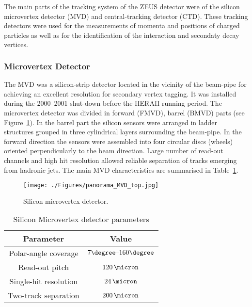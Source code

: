 The main parts of the tracking system of the ZEUS detector were of the silicon microvertex detector (MVD) and central-tracking detector (CTD). These tracking detectors were used for the measurements of momenta and positions of charged particles as well as for the identification of the interaction and secondaty decay vertices.

\subsubsection{Microvertex Detector}
\label{subsubsec:mvd}
The MVD was a silicon-strip detector located in the vicinity of the beam-pipe for achieving an excellent resolution for secondary vertex tagging. It was installed during the 2000--2001 shut-down before the HERAII running period. The microvertex detector was divided in forward (FMVD), barrel (BMVD) parts (see Figure~\ref{fig:MVD_artistic}). In the barrel part the silicon sensors were arranged in ladder structures grouped in three cylindrical layers surrounding the beam-pipe. In the forward direction the sensors were assembled into four circular discs (wheels) oriented perpendicularly to the beam direction. Large number of read-out channels and high hit resolution allowed reliable separation of tracks emerging from hadronic jets. The main MVD characteristics are summarised in Table~\ref{tab:mvdgeomparameters}. 

\begin{figure}[htbp]
	\centering
		\texttt{[image: ./Figures/panorama\_MVD\_top.jpg]}
	\caption{Silicon microvertex detector.}
	\label{fig:MVD_artistic}
\end{figure}

\begin{table}[htbp]
\begin{tabular}{ | c | c | }
     \hline
      Parameter & Value \\
			\hline
			\hline
			Polar-angle coverage & $7\degree \mbox{--} 160\degree$ \\ \hline
      Read-out pitch & $120\,\micron$  \\ \hline
			Single-hit resolution & $24\,\micron$ \\ \hline 
			Two-track separation & $200\,\micron$ \\
      \hline
     \end{tabular}
	\caption{Silicon Microvertex detector parameters}
	\label{tab:mvdgeomparameters}
\end{table}

